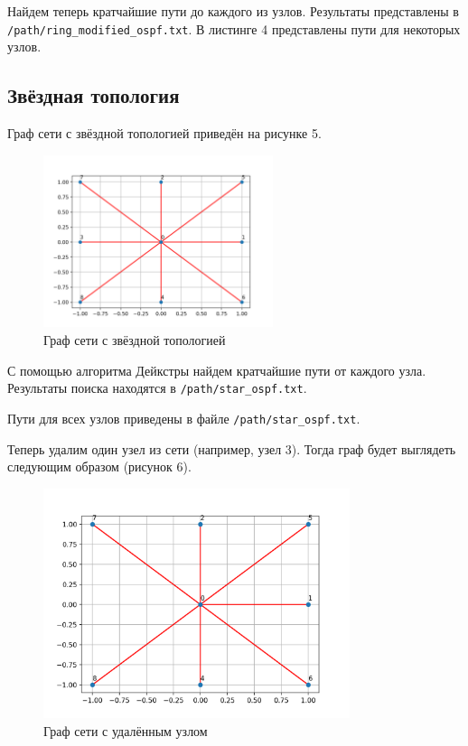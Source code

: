 \documentclass[a4paper,14pt]{extarticle}
\begin{document}
Найдем теперь кратчайшие пути до каждого из узлов. Результаты представлены в \texttt{/path/ring\_modified\_ospf.txt}. В листинге 4 представлены пути для некоторых узлов.



\subsection{Звёздная топология}
Граф сети с звёздной топологией приведён на рисунке 5.

\begin{figure}[htbp]
    \centering
    \includegraphics[width=0.6\textwidth]{img/star_graph.png}
    \caption{Граф сети с звёздной топологией}
    \label{fig:hamiltonianGraph}
\end{figure}

С помощью алгоритма Дейкстры найдем кратчайшие пути от каждого узла. Результаты поиска находятся в \texttt{/path/star\_ospf.txt}.



Пути для всех узлов приведены в файле \texttt{/path/star\_ospf.txt}.

Теперь удалим один узел из сети (например, узел 3). Тогда граф будет выглядеть следующим образом (рисунок 6).

\clearpage
\begin{figure}[htbp]
    \centering
    \includegraphics[width=0.8\textwidth]{img/star_modified.png}
    \caption{Граф сети с удалённым узлом}
    \label{fig:hamiltonianGraph}
\end{figure}
\end{document}
